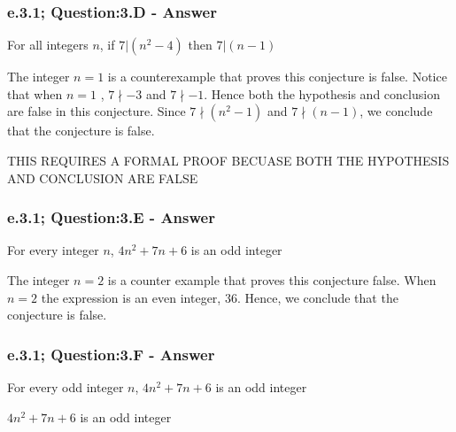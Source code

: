 \subsubsection*{e.3.1; Question:3.D - Answer}

\begin{tcolorbox}
	\begin{conjecture}
		For all integers $n$, if $7 |(n^2 - 4)$ then $7|(n - 1)$
	\end{conjecture}
\end{tcolorbox}

The integer $n=1$ is a counterexample that proves this conjecture is false. Notice that when $n=1$ , $7 \nmid -3$ and $7 \nmid -1$. Hence both the hypothesis and conclusion are false in this conjecture. Since $7 \nmid (n^2 - 1)$ and $7 \nmid (n - 1)$, we conclude that the conjecture is false.  

THIS REQUIRES A FORMAL PROOF BECUASE BOTH THE HYPOTHESIS AND CONCLUSION ARE FALSE

\subsubsection*{e.3.1; Question:3.E - Answer}

\begin{tcolorbox}
	\begin{conjecture}
		For every integer $n$, $4n^2 + 7n + 6$ is an odd integer
	\end{conjecture}
\end{tcolorbox}

The integer $n=2$ is a counter example that proves this conjecture false. When $n=2$ the expression is an even integer, $36$. Hence, we conclude that the conjecture is false. 



\subsubsection*{e.3.1; Question:3.F - Answer}
For every odd integer $n$, $4n^2 + 7n + 6$ is an odd integer

\begin{tcolorbox}
	\begin{theorem}
		$4n^2 + 7n + 6$ is an odd integer
	\end{theorem}
\end{tcolorbox}


